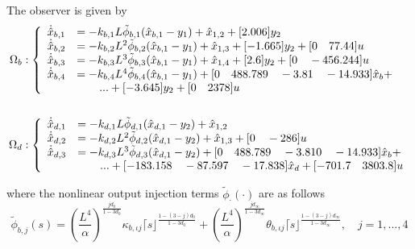 \documentclass[11pt,letterpaper,twoside,openright]{report}
\newcommand{\sig}[2]{\lceil#1\rfloor^{#2}}
\begin{document}
The observer is given by
\begin{equation}
	\begin{split}
	\Omega_{b} &: \left\{
	\begin{array}{rl}
		\dot{\hat{x}}_{b,1} &= -k_{b,1}L \tilde{\phi}_{b,1}( \hat{x}_{b,1}-y_{1} ) + \hat{x}_{1,2} + [2.006]y_2 \\
		\dot{\hat{x}}_{b,2} &= -k_{b,2}L^{2} \tilde{\phi}_{b,2}( \hat{x}_{b,1}-y_{1} ) + \hat{x}_{1,3} + [-1.665]y_2 + [0 \quad 77.44]u \\
		\dot{\hat{x}}_{b,3} &= -k_{b,3}L^{3}  \tilde{\phi}_{b,3}( \hat{x}_{b,1}-y_{1} ) + \hat{x}_{1,4} + [2.6]y_2 + [0 \quad -456.244]u \\
		\dot{\hat{x}}_{b,4} &= -k_{b,4}L^{4} \tilde{\phi}_{b,4}( \hat{x}_{b,1}-y_{1} ) + [0 \quad 488.789 \quad -3.81 \quad -14.933]\hat{x}_b + \\
		& \qquad ... + [-3.645]y_2  + [0 \quad 2378]u \\
	\end{array}
	\right. \\
	\vspace{2cm}\\
	\Omega_{d} &: \left\{
	\begin{array}{rl}
		\dot{\hat{x}}_{d,1} &= -k_{d,1}L \tilde{\phi}_{d,1}( \hat{x}_{d,1}-y_{2} ) + \hat{x}_{1,2} \\
		\dot{\hat{x}}_{d,2} &= -k_{d,2}L^{2} \tilde{\phi}_{d,2}( \hat{x}_{d,1}-y_{2} ) + \hat{x}_{1,3} + [0 \quad -286]u\\
		\dot{\hat{x}}_{d,3} &= -k_{d,3}L^{3} \tilde{\phi}_{d,3}( \hat{x}_{d,1}-y_{2} ) +  [0 \quad 488.789 \quad -3.810 \quad -14.933]\hat{x}_b + \\
		& \qquad ... +  [-183.158 \quad -87.597 \quad -17.838]\hat{x}_d + [-701.7 \quad 3803.8]u
	\end{array}
	\right. \\
\end{split}
\end{equation}

where the nonlinear output injection terms $\tilde{\phi}_{\cdot}(\cdot)$ are as follows
\begin{equation}\label{ecu: CH4 example phi_b}
	\tilde{\phi}_{b,j}(s) = \left( \frac{L^{4}}{\alpha}\right)^{\frac{jd_0}{1-3d_0}}\kappa_{b,\iota j} \sig{s}{\frac{1-(3-j)d_0}{1-3d_0}} + \left( \frac{L^{4}}{\alpha}\right)^{\frac{jd_{\infty}}{1-3d_{\infty}}}\theta_{b,\iota j} \sig{s}{\frac{1-(3-j)d_{\infty}}{1-3d_{\infty}}}, \quad j=1,...,4
\end{equation}
\end{document}
